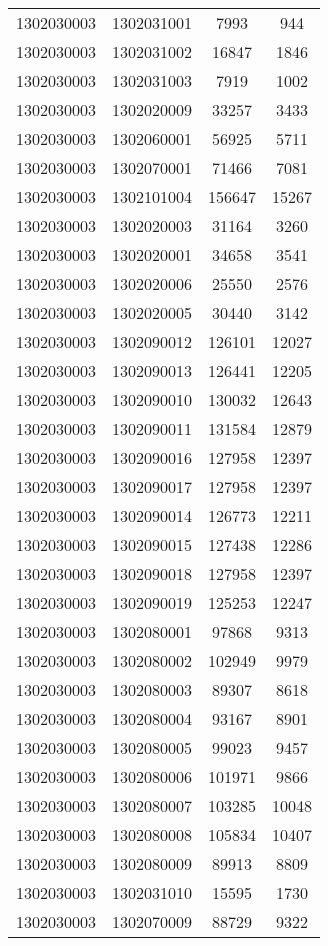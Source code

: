 \begin{longtable}{llcc}
1302030003 & 1302031001 & 7993 & 944\\
1302030003 & 1302031002 & 16847 & 1846\\
1302030003 & 1302031003 & 7919 & 1002\\
1302030003 & 1302020009 & 33257 & 3433\\
1302030003 & 1302060001 & 56925 & 5711\\
1302030003 & 1302070001 & 71466 & 7081\\
1302030003 & 1302101004 & 156647 & 15267\\
1302030003 & 1302020003 & 31164 & 3260\\
1302030003 & 1302020001 & 34658 & 3541\\
1302030003 & 1302020006 & 25550 & 2576\\
1302030003 & 1302020005 & 30440 & 3142\\
1302030003 & 1302090012 & 126101 & 12027\\
1302030003 & 1302090013 & 126441 & 12205\\
1302030003 & 1302090010 & 130032 & 12643\\
1302030003 & 1302090011 & 131584 & 12879\\
1302030003 & 1302090016 & 127958 & 12397\\
1302030003 & 1302090017 & 127958 & 12397\\
1302030003 & 1302090014 & 126773 & 12211\\
1302030003 & 1302090015 & 127438 & 12286\\
1302030003 & 1302090018 & 127958 & 12397\\
1302030003 & 1302090019 & 125253 & 12247\\
1302030003 & 1302080001 & 97868 & 9313\\
1302030003 & 1302080002 & 102949 & 9979\\
1302030003 & 1302080003 & 89307 & 8618\\
1302030003 & 1302080004 & 93167 & 8901\\
1302030003 & 1302080005 & 99023 & 9457\\
1302030003 & 1302080006 & 101971 & 9866\\
1302030003 & 1302080007 & 103285 & 10048\\
1302030003 & 1302080008 & 105834 & 10407\\
1302030003 & 1302080009 & 89913 & 8809\\
1302030003 & 1302031010 & 15595 & 1730\\
1302030003 & 1302070009 & 88729 & 9322\\

\end{longtable}
